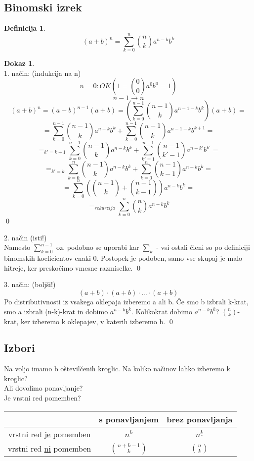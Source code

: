 \documentclass[a4paper,12pt]{article}
\theoremstyle{definition}
\newtheorem{defn}[counter]{Definicija}
\newtheorem{pro}[counter]{Dokaz}
\theoremstyle{remark}
\begin{document}
\subsection{Binomski izrek}
\begin{defn}
\[(a + b)^n = \sum_{k = 0}^{n}{\binom{n}{k} a^{n-k} b^k}\]
\end{defn}
\begin{pro}\mbox{}\\
1. način: (indukcija na n)\\
\[n = 0: OK (1 = \binom{0}{0} a^0b^0 = 1)\]
\[n - 1 \rightarrow n\]
\[(a+b)^n = (a+b)^{n-1}(a+b) = (\sum_{k=0}^{n-1} \binom{n-1}{k} a^{n-1-k}b^k)(a+b) =\]
\[ = \sum_{k=0}^{n-1} \binom{n-1}{k} a^{n-k}b^k + \sum_{k=0}^{n-1} \binom{n-1}{k} a^{n-1-k}b^{k+1} =\]
\[=_{k' = k + 1} \sum_{k=0}^{n-1} \binom{n-1}{k} a^{n-k}b^k + \sum_{k'=1}^{n-1} \binom{n-1}{k'-1} a^{n-k'}b^{k'} = \]
\[=_{k'=k} \sum_{k=0}^{n} {\binom{n-1}{k}a^{n-k} b^k} + \sum_{k=0}^{n} {\binom{n-1}{k-1}a^{n-k} b^k} =\]
\[= \sum_{k=0}^n (\binom{n-1}{k} + \binom{n-1}{k-1})a^{n-k}b^k =\]
\[=_{rekurzija} \sum_{k=0}^n \binom{n}{k}a^{n-k}b^k\]
\qed

2. način (isti!)\\
Namesto $\sum_{k=0}^{n-1}$ oz. podobno se uporabi kar $\sum_k$ - vsi ostali členi so po definiciji binomskih koeficientov enaki 0. Postopek je podoben, samo vse skupaj je malo hitreje, ker preskočimo vmesne razmiselke.
\qed

3. način: (boljši!)\\
\[(a+b) \cdot (a+b) \cdot... \cdot (a+b)\]
Po distributivnosti iz vsakega oklepaja izberemo a ali b. Če smo b izbrali k-krat, smo a izbrali (n-k)-krat in dobimo $a^{n-k}b^k$. Kolikokrat dobimo $a^{n-k}b^k$? $\binom{n}{k}$-krat, ker izberemo k oklepajev, v katerih izberemo b.
\qed
\end{pro}


\subsection{Izbori}

Na voljo imamo b oštevilčenih kroglic. Na koliko načinov lahko izberemo k kroglic?\\
Ali dovolimo ponavljanje?\\
Je vrstni red pomemben?\\

\begin{tabular}{c|c|c}

 & s ponavljanjem & brez ponavljanja \\
\hline
vrstni red \underline{je} pomemben & $n^k$ & $n^{\underline{k}}$\\
\hline
vrstni red \underline{ni} pomemben & $\binom{n + k - 1}{k}$ & $\binom{n}{k}$
\end{tabular}
\end{document}
